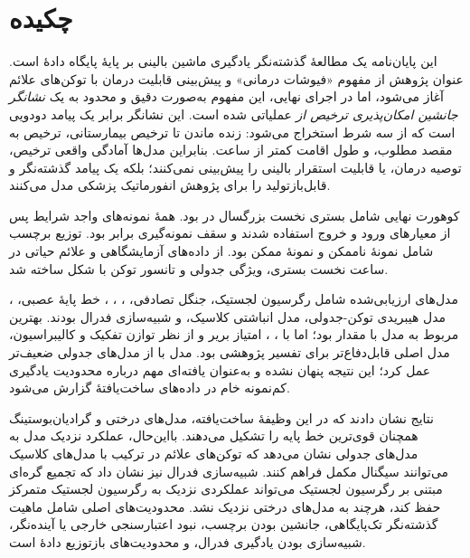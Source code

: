 \chapter*{چکیده}
این پایان‌نامه یک مطالعۀ گذشته‌نگر یادگیری ماشین بالینی بر پایۀ پایگاه دادۀ  است. عنوان پژوهش از مفهوم «فیوشات درمانی» و پیش‌بینی قابلیت درمان با توکن‌های علائم آغاز می‌شود، اما در اجرای نهایی، این مفهوم به‌صورت دقیق و محدود به یک \emph{نشانگر جانشین امکان‌پذیری ترخیص از } عملیاتی شده است. این نشانگر برابر یک پیامد دودویی است که از سه شرط استخراج می‌شود: زنده ماندن تا ترخیص بیمارستانی، ترخیص به مقصد مطلوب، و طول اقامت  کمتر از  ساعت. بنابراین مدل‌ها آمادگی واقعی ترخیص، توصیه درمان، یا قابلیت استقرار بالینی را پیش‌بینی نمی‌کنند؛ بلکه یک پیامد گذشته‌نگر و قابل‌بازتولید را برای پژوهش انفورماتیک پزشکی مدل می‌کنند.

کوهورت نهایی شامل \textbf{} بستری نخست بزرگسال در  بود. همۀ نمونه‌های واجد شرایط پس از معیارهای ورود و خروج استفاده شدند و سقف نمونه‌گیری برابر  بود. توزیع برچسب شامل  نمونۀ ناممکن و  نمونۀ ممکن بود. از داده‌های آزمایشگاهی و علائم حیاتی در  ساعت نخست بستری،  ویژگی جدولی و تانسور توکن با شکل  ساخته شد.

مدل‌های ارزیابی‌شده شامل رگرسیون لجستیک، جنگل تصادفی، ، ، ، خط پایۀ عصبی، ، مدل هیبریدی توکن-جدولی، مدل انباشتی کلاسیک، و شبیه‌سازی فدرال بودند. بهترین  مربوط به مدل  با مقدار  بود؛ اما  با  ،  ، امتیاز بریر  و   از نظر توازن تفکیک و کالیبراسیون، مدل اصلی قابل‌دفاع‌تر برای تفسیر پژوهشی بود. مدل  با   از مدل‌های جدولی ضعیف‌تر عمل کرد؛ این نتیجه پنهان نشده و به‌عنوان یافته‌ای مهم درباره محدودیت یادگیری کم‌نمونه خام در داده‌های ساخت‌یافتۀ  گزارش می‌شود.

نتایج نشان دادند که در این وظیفۀ ساخت‌یافته، مدل‌های درختی و گرادیان‌بوستینگ همچنان قوی‌ترین خط پایه را تشکیل می‌دهند. بااین‌حال، عملکرد نزدیک مدل  به مدل‌های جدولی نشان می‌دهد که توکن‌های علائم در ترکیب با مدل‌های کلاسیک می‌توانند سیگنال مکمل فراهم کنند. شبیه‌سازی فدرال نیز نشان داد که تجمیع گره‌ای مبتنی بر رگرسیون لجستیک می‌تواند عملکردی نزدیک به رگرسیون لجستیک متمرکز حفظ کند، هرچند به مدل‌های درختی نزدیک نشد. محدودیت‌های اصلی شامل ماهیت گذشته‌نگر تک‌پایگاهی، جانشین بودن برچسب، نبود اعتبارسنجی خارجی یا آینده‌نگر، شبیه‌سازی بودن یادگیری فدرال، و محدودیت‌های بازتوزیع دادۀ  است.

